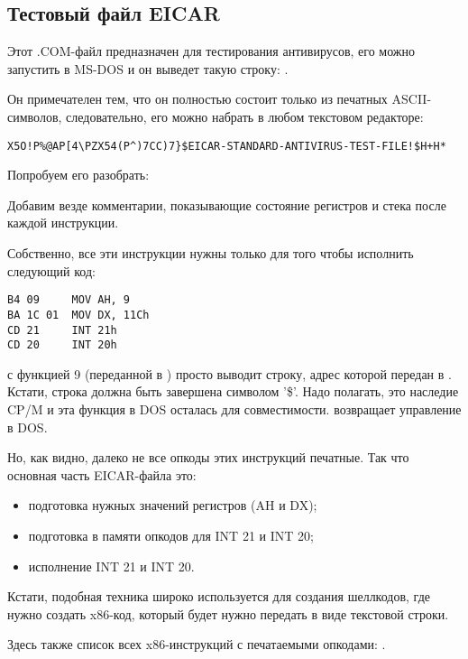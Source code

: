 
\subsection{Тестовый файл EICAR}
\label{subsec:EICAR}

Этот .COM-файл предназначен для тестирования антивирусов, его можно запустить в MS-DOS
и он выведет такую строку: .

Он примечателен тем, что он полностью состоит только из печатных ASCII-символов, следовательно, его можно
набрать в любом текстовом редакторе:

\begin{lstlisting}
X5O!P%@AP[4\PZX54(P^)7CC)7}$EICAR-STANDARD-ANTIVIRUS-TEST-FILE!$H+H*
\end{lstlisting}

Попробуем его разобрать:



Добавим везде комментарии, показывающие состояние регистров и стека после каждой инструкции.

Собственно, все эти инструкции нужны только для того чтобы исполнить следующий код:

\begin{lstlisting}[style=customasmx86]
B4 09     MOV AH, 9
BA 1C 01  MOV DX, 11Ch
CD 21     INT 21h
CD 20     INT 20h
\end{lstlisting}

 с функцией 9 (переданной в ) просто выводит строку, адрес которой передан в .
Кстати, строка должна быть завершена символом '\$'.
Надо полагать, это наследие \gls{CP/M} 
и эта функция в DOS осталась для совместимости.
 возвращает управление в DOS.

Но, как видно, далеко не все опкоды этих инструкций печатные.
Так что основная часть EICAR-файла это:

\begin{itemize}
\item подготовка нужных значений регистров (AH и DX);
\item подготовка в памяти опкодов для INT 21 и INT 20;
\item исполнение INT 21 и INT 20.
\end{itemize}

Кстати, подобная техника широко используется для создания шеллкодов, 
где нужно создать x86-код, который будет нужно передать в виде текстовой строки.

Здесь также список всех x86-инструкций с печатаемыми опкодами: .
